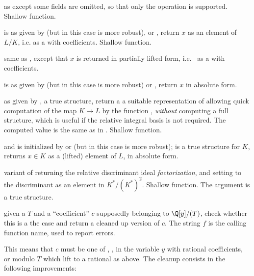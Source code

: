  as  except some
fields are omitted, so that only the  operation is supported.
Shallow function.

  is as
given by  (but in this case  is more
robust),  or , return $x$ as an element
of $L/K$, i.e. as a  with  coefficients. Shallow
function.

 same as ,
except that $x$ is returned in partially lifted form, i.e.~ as a
 with  coefficients.

  is as given by
 (but in this case  is more robust)
or , return $x$ in absolute form.

  as
given by ,  a true  structure, return a
a suitable representation of  allowing quick
computation of the map $K\to L$ by the function , \emph{without}
computing a full  structure, which is useful if the relative
integral basis is not required. The computed value is the same as in
. Shallow function.

  and is initialized by
 or  (but in this case  is more
robust);  is a true  structure for $K$, returns $x \in K$ as
a (lifted) element of $L$, in absolute form.

 variant of 
returning the relative discriminant ideal \emph{factorization}, and setting
 to the discriminant as an element in $K^*/(K^*)^2$. Shallow
function. The argument  is a true  structure.

 given
a  $T$ and a ``coefficient'' $c$ supposedly belonging to $\Q[y]/(T)$,
check whether this is a the case and return a cleaned up version of $c$.
The string $f$ is the calling function name, used to report errors.

This means that $c$ must be one of , ,  in the
variable $y$ with rational coefficients, or  modulo $T$ which lift
to a rational  as above. The cleanup consists in the following
improvements:

